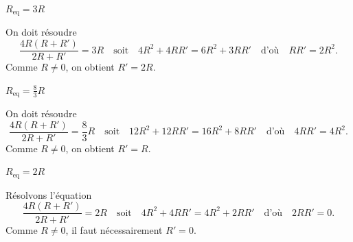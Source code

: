 \begin{enonce}
$R_\text{eq} = 3R$
\end{enonce}


\begin{corrige}
On doit résoudre 
\[
\frac{4R(R+R')}{2R+R'}=3R
\quad\text{soit}\quad
4R^2+4RR'=6R^2+3RR'
\quad\text{d'où}\quad
RR'=2R^2.
\]
Comme $R\neq 0$, on obtient $R'=2R$.
\end{corrige}




\begin{enonce}
$R_\text{eq} = \frac{8}{3}R$
\end{enonce}


\begin{corrige}
On doit résoudre 
\[
\frac{4R(R+R')}{2R+R'}=\frac83 R
\quad\text{soit}\quad
12R^2+12RR'=16R^2+8RR'
\quad\text{d'où}\quad
4RR'=4R^2.
\]
Comme $R\neq 0$, on obtient $R'=R$.
\end{corrige}




\begin{enonce}
$R_\text{eq} = 2R$
\end{enonce}


\begin{corrige}
Résolvons l'équation 
\[
\frac{4R(R+R')}{2R+R'}=2 R
\quad\text{soit}\quad
4R^2+4RR'=4R^2+2RR'
\quad\text{d'où}\quad
2RR'=0.
\]
Comme $R\neq 0$, il faut nécessairement $R'=0$.
\end{corrige}


\finEntrainement













